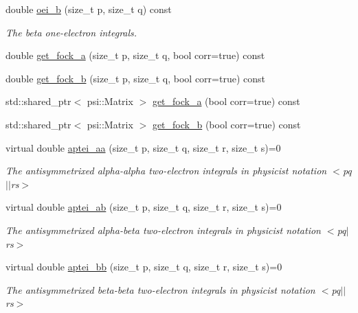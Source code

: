 \begin{DoxyCompactItemize}
double \mbox{\hyperlink{classforte_1_1_forte_integrals_ace33795c89d99da0aa8bac4a95263d23}{oei\+\_\+b}} (size\+\_\+t p, size\+\_\+t q) const
\begin{DoxyCompactList}\small\item\em The beta one-\/electron integrals. \end{DoxyCompactList}\item 
double \mbox{\hyperlink{classforte_1_1_forte_integrals_a15ff05380f547fa00132ff7f993f1aa0}{get\+\_\+fock\+\_\+a}} (size\+\_\+t p, size\+\_\+t q, bool corr=true) const
\item 
double \mbox{\hyperlink{classforte_1_1_forte_integrals_a62a831e5387b3f2b6e7edfc5bf83c70b}{get\+\_\+fock\+\_\+b}} (size\+\_\+t p, size\+\_\+t q, bool corr=true) const
\item 
std\+::shared\+\_\+ptr$<$ psi\+::\+Matrix $>$ \mbox{\hyperlink{classforte_1_1_forte_integrals_a8d1ebbd9be1d2d06685c355dc8f1f384}{get\+\_\+fock\+\_\+a}} (bool corr=true) const
\item 
std\+::shared\+\_\+ptr$<$ psi\+::\+Matrix $>$ \mbox{\hyperlink{classforte_1_1_forte_integrals_adb5c74105cf591a402ca01d37c7c9738}{get\+\_\+fock\+\_\+b}} (bool corr=true) const
\item 
virtual double \mbox{\hyperlink{classforte_1_1_forte_integrals_afc84c157025b56ee0f8e3b1abe1c0a5f}{aptei\+\_\+aa}} (size\+\_\+t p, size\+\_\+t q, size\+\_\+t r, size\+\_\+t s)=0
\begin{DoxyCompactList}\small\item\em The antisymmetrixed alpha-\/alpha two-\/electron integrals in physicist notation $<$pq$\vert$$\vert$rs$>$ \end{DoxyCompactList}\item 
virtual double \mbox{\hyperlink{classforte_1_1_forte_integrals_a45efc2329cdfc7e4690cbe85688b947e}{aptei\+\_\+ab}} (size\+\_\+t p, size\+\_\+t q, size\+\_\+t r, size\+\_\+t s)=0
\begin{DoxyCompactList}\small\item\em The antisymmetrixed alpha-\/beta two-\/electron integrals in physicist notation $<$pq$\vert$rs$>$ \end{DoxyCompactList}\item 
virtual double \mbox{\hyperlink{classforte_1_1_forte_integrals_a246225031c3799dc446f94e0e732c3ac}{aptei\+\_\+bb}} (size\+\_\+t p, size\+\_\+t q, size\+\_\+t r, size\+\_\+t s)=0
\begin{DoxyCompactList}\small\item\em The antisymmetrixed beta-\/beta two-\/electron integrals in physicist notation $<$pq$\vert$$\vert$rs$>$ \end{DoxyCompactList}\item 

\end{DoxyCompactItemize}
